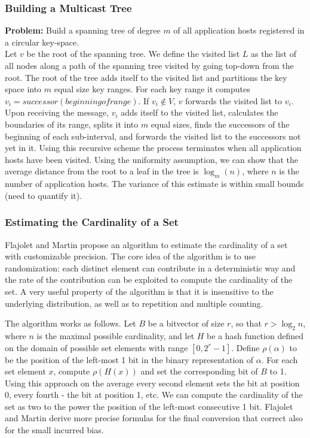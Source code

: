 \documentclass[11pt,twocolumn]{MyTightStyle}
\theoremstyle{plain}
\theoremstyle{definition}
\theoremstyle{remark}
\numberwithin{equation}{section}
\begin{document}
\subsubsection{Building a Multicast Tree}
\label{sec:building}
{\bf Problem:} Build a spanning tree of degree $m$ of all application
hosts registered in a circular key-space.\\

 Let $v$ be the root of the spanning
tree. We define the visited list $L$ as the list of all nodes along a path
of the spanning tree visited by going top-down from the root. The root
of the tree adds itself to the visited list and partitions the key space
into $m$ equal size key 
ranges. For each key range it computes $v_i =
successor(beginning of range)$. If $v_i \notin V$, $v$ forwards the
visited list to $v_i$. Upon receiving the message, $v_i$ adds itself
to the visited list, calculates the boundaries of its range, splits it
into $m$ equal sizes, finds the successors of the beginning of
each sub-interval, and forwards the visited list to the successors not
yet in it. Using this recursive scheme the process terminates when all
application hosts have been visited. Using the uniformity assumption,
we can show that the average distance from the root to a leaf in the
tree is $\log_m(n)$, where $n$ is the number of application hosts. The
variance of this estimate is within small bounds (need to quantify it).



\subsubsection{Estimating the Cardinality of a Set}
Flajolet and Martin propose an algorithm to estimate the cardinality
of a set with customizable precision. The core idea of the algorithm
is to use randomization: each distinct element can contribute in a
deterministic way and the rate of the contribution can be exploited to
compute the cardinality of the set. A very useful property of the
algorithm is that it is insensitive to the underlying
distribution, as well as to repetition and multiple counting.

The algorithm works as follows. Let $B$ be a bitvector of size $r$, so that $r
> \log_{2}{n}$, where $n$ is the maximal possible cardinality, and let
$H$ be a hash function defined on the domain of possible set elements
with range $[0, 2^r-1]$. Define $\rho(\alpha)$ to be the position of
the left-most 1 bit in the binary representation of $\alpha$. For each
set element $x$, compute $\rho(H(x))$ and set the corresponding bit of
$B$ to 1. Using this approach on the average every second element sets
the bit at position 0, every fourth - the bit at position 1, etc. We
can compute the cardinality of the set as two to the power the position of the
left-most consecutive 1 bit. Flajolet and Martin derive more precise
formulas for the final conversion that correct also for the small
incurred bias.
\end{document}
